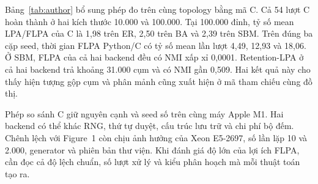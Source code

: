 Bảng~\ref{tab:author} bổ sung phép đo trên cùng topology bằng mã C. Cả 54 lượt C hoàn thành ở hai kích thước 10.000 và 100.000. Tại 100.000 đỉnh, tỷ số mean LPA/FLPA của C là 1,98 trên ER, 2,50 trên BA và 2,39 trên SBM. Trên đúng ba cặp seed, thời gian FLPA Python/C có tỷ số mean lần lượt 4,49, 12,93 và 18,06. Ở SBM, FLPA của cả hai backend đều có NMI xấp xỉ 0,0001. Retention-LPA ở cả hai backend trả khoảng 31.000 cụm và có NMI gần 0,509. Hai kết quả này cho thấy hiện tượng gộp cụm và phân mảnh cũng xuất hiện ở mã tham chiếu cùng đồ thị.

Phép so sánh C giữ nguyên cạnh và seed số trên cùng máy Apple M1. Hai backend có thể khác RNG, thứ tự duyệt, cấu trúc lưu trữ và chi phí bộ đếm. Chênh lệch với Figure~1 còn chịu ảnh hưởng của Xeon E5-2697, số lần lặp 10 và 2.000, generator và phiên bản thư viện. Khi đánh giá độ lớn của lợi ích FLPA, cần đọc cả độ lệch chuẩn, số lượt xử lý và kiểu phân hoạch mà mỗi thuật toán tạo ra.
